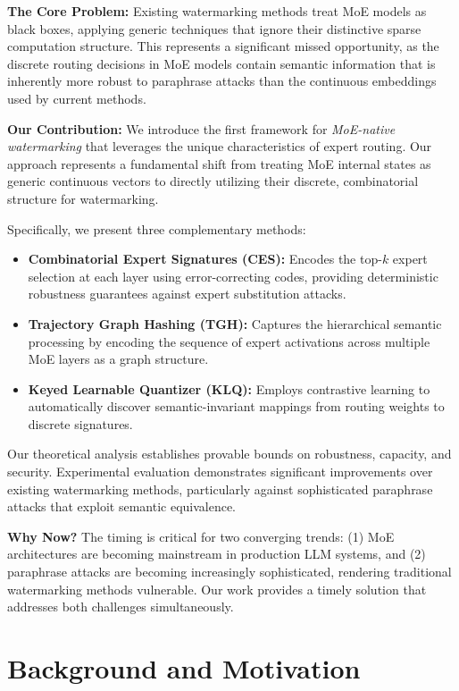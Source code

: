 \textbf{The Core Problem:} Existing watermarking methods treat MoE models as black boxes, applying generic techniques that ignore their distinctive sparse computation structure. This represents a significant missed opportunity, as the discrete routing decisions in MoE models contain semantic information that is inherently more robust to paraphrase attacks than the continuous embeddings used by current methods.

\textbf{Our Contribution:} We introduce the first framework for \textit{MoE-native watermarking} that leverages the unique characteristics of expert routing. Our approach represents a fundamental shift from treating MoE internal states as generic continuous vectors to directly utilizing their discrete, combinatorial structure for watermarking.

Specifically, we present three complementary methods:

\begin{itemize}
\item \textbf{Combinatorial Expert Signatures (CES):} Encodes the top-$k$ expert selection at each layer using error-correcting codes, providing deterministic robustness guarantees against expert substitution attacks.
\item \textbf{Trajectory Graph Hashing (TGH):} Captures the hierarchical semantic processing by encoding the sequence of expert activations across multiple MoE layers as a graph structure.
\item \textbf{Keyed Learnable Quantizer (KLQ):} Employs contrastive learning to automatically discover semantic-invariant mappings from routing weights to discrete signatures.
\end{itemize}

Our theoretical analysis establishes provable bounds on robustness, capacity, and security. Experimental evaluation demonstrates significant improvements over existing watermarking methods, particularly against sophisticated paraphrase attacks that exploit semantic equivalence.

\textbf{Why Now?} The timing is critical for two converging trends: (1) MoE architectures are becoming mainstream in production LLM systems, and (2) paraphrase attacks are becoming increasingly sophisticated, rendering traditional watermarking methods vulnerable. Our work provides a timely solution that addresses both challenges simultaneously.

\section{Background and Motivation}

